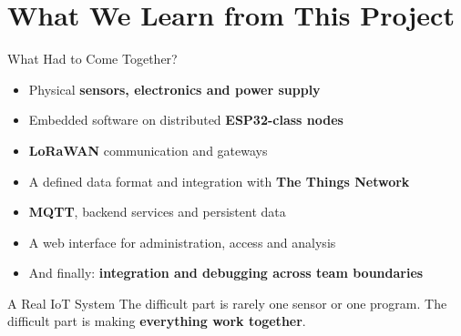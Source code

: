 \part[nopartpage]{What We Learn from This Project}

\begin{frame}{What Had to Come Together?}
\begin{itemize}
    \item Physical \textbf{sensors, electronics and power supply}
    \item Embedded software on distributed \textbf{ESP32-class nodes}
    \item \textbf{LoRaWAN} communication and gateways
    \item A defined data format and integration with \textbf{The Things Network}
    \item \textbf{MQTT}, backend services and persistent data
    \item A web interface for administration, access and analysis
    \item And finally: \textbf{integration and debugging across team boundaries}
\end{itemize}
\begin{alertblock}{A Real IoT System}
The difficult part is rarely one sensor or one program. The difficult part is making \textbf{everything work together}.
\end{alertblock}
\end{frame}
